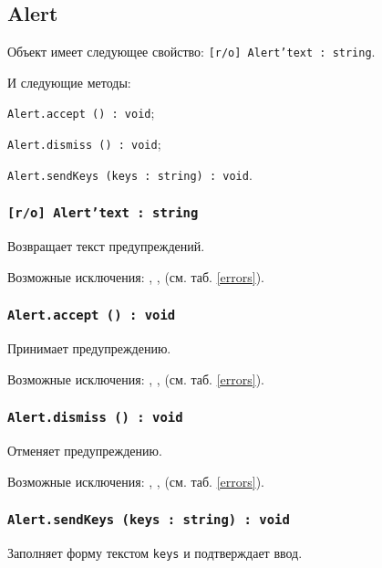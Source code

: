 \subsection{{\color{orange} Alert}}

Объект \alert{} имеет следующее свойство: \texttt{[r/o] Alert'text : string}.

И следующие методы:
\begin{icItems}
	\item \texttt{Alert.accept () : void};
	\item \texttt{Alert.dismiss () : void};
	\item \texttt{Alert.sendKeys (keys : string) : void}.
\end{icItems}

\subsubsection{\texttt{[r/o] Alert'text : string}}

Возвращает текст предупреждений.

Возможные исключения: , ,  (см. таб. \ref{errors}).

\subsubsection{\texttt{Alert.accept () : void}}

Принимает предупреждению.

Возможные исключения: , ,  (см. таб. \ref{errors}).

\subsubsection{\texttt{Alert.dismiss () : void}}

Отменяет предупреждению.

Возможные исключения: , ,  (см. таб. \ref{errors}).

\subsubsection{\texttt{Alert.sendKeys (keys : string) : void}}

Заполняет форму текстом \texttt{keys} и подтверждает ввод.

